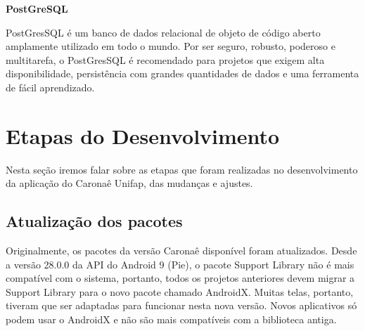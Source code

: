	\textbf{PostGreSQL}
	
	PostGresSQL é um banco de dados relacional de objeto de código aberto amplamente utilizado em todo o mundo. Por ser seguro, robusto, poderoso e multitarefa, o PostGresSQL é recomendado para projetos que exigem alta disponibilidade, persistência com grandes quantidades de dados e uma ferramenta de fácil aprendizado.
	
	


\section{Etapas do Desenvolvimento}

Nesta seção iremos falar sobre as etapas que foram realizadas no desenvolvimento da aplicação do Caronaê Unifap, das mudanças e ajustes.

\subsection{Atualização dos pacotes}
Originalmente, os pacotes da versão Caronaê disponível foram atualizados. Desde a versão 28.0.0 da API do Android 9 (Pie), o pacote Support Library não é mais compatível com o sistema, portanto, todos os projetos anteriores devem migrar a Support Library para o novo pacote chamado AndroidX. Muitas telas, portanto, tiveram que ser adaptadas para funcionar nesta nova versão. Novos aplicativos só podem usar o AndroidX e não são mais compatíveis com a biblioteca antiga.

